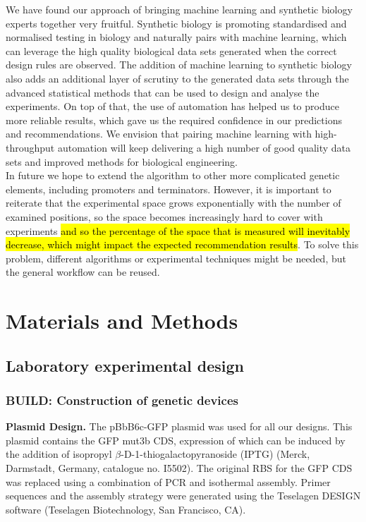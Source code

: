 \documentclass{scrartcl}[2013/05/29]%
\begin{document}
We have found our approach of bringing machine learning and synthetic biology experts together very fruitful.
Synthetic biology is promoting standardised and normalised testing in biology and naturally pairs with machine learning, which can leverage the high quality biological data sets generated when the correct design rules are observed.
The addition of machine learning to synthetic biology also adds an additional layer of scrutiny to the generated data sets through the advanced statistical methods that can be used to design and analyse the experiments.
On top of that, the use of automation has helped us to produce more reliable results, which gave us the required confidence in our predictions and recommendations.
We envision that pairing machine learning with high-throughput automation will keep delivering a high number of good quality data sets and improved methods for biological engineering.\\

In future we hope to extend the algorithm to other more complicated genetic elements, including promoters and terminators.
However, it is important to reiterate that the experimental space grows exponentially with the number of examined positions, so the space becomes increasingly hard to cover with experiments \hl{and so the percentage of the space that is measured will inevitably decrease, which might impact the expected recommendation results}.
To solve this problem, different algorithms or experimental techniques might be needed, but the general workflow can be reused.\\


\section{Materials and Methods}

\subsection{Laboratory experimental design}

\subsubsection{BUILD: Construction of genetic devices}

\textbf{Plasmid Design.}
The pBbB6c-GFP plasmid was used for all our designs.
This plasmid contains the GFP mut3b CDS, expression of which can be induced by the addition of isopropyl $\beta$-D-1-thiogalactopyranoside (IPTG) (Merck, Darmstadt, Germany, catalogue no. I5502).
The original RBS for the GFP CDS was replaced using a combination of PCR and isothermal assembly.
Primer sequences and the assembly strategy were generated using the Teselagen DESIGN software (Teselagen Biotechnology, San Francisco, CA).
\end{document}
